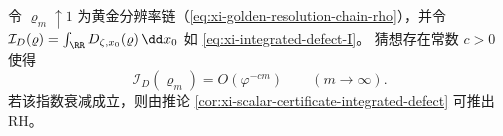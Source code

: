 \begin{conjecture}[黄金分辨率链上的全局积分缺陷指数衰减]\label{conj:xi-integrated-defect-golden-exponential-decay}
令 \(\varrho_m\uparrow 1\) 为黄金分辨率链（\eqref{eq:xi-golden-resolution-chain-rho}），并令 \(\mathcal{I}_D(\varrho)=\int_{\RR}D_{\zeta,x_0}(\varrho)\,\dd x_0\) 如 \eqref{eq:xi-integrated-defect-I}。
猜想存在常数 \(c>0\) 使得
\[
\mathcal{I}_D(\varrho_m)=O(\varphi^{-cm})\qquad(m\to\infty).
\]
若该指数衰减成立，则由推论 \ref{cor:xi-scalar-certificate-integrated-defect} 可推出 RH。
\end{conjecture}

\endinput

